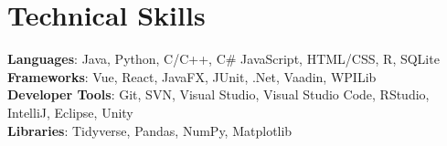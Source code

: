 \documentclass[letterpaper,11pt]{article}
\begin{document}
\section{Technical Skills}
 \begin{itemize}[leftmargin=0.15in, label={}]
    \small{
    \item{
     \textbf{Languages}{: Java, Python, C/C++, C\# JavaScript, HTML/CSS, R, SQLite} \\
     \textbf{Frameworks}{: Vue, React, JavaFX, JUnit, .Net, Vaadin, WPILib} \\
     \textbf{Developer Tools}{: Git, SVN, Visual Studio, Visual Studio Code, RStudio, IntelliJ, Eclipse, Unity} \\
     \textbf{Libraries}{: Tidyverse, Pandas, NumPy, Matplotlib}
    }}
 \end{itemize}


\end{document}
